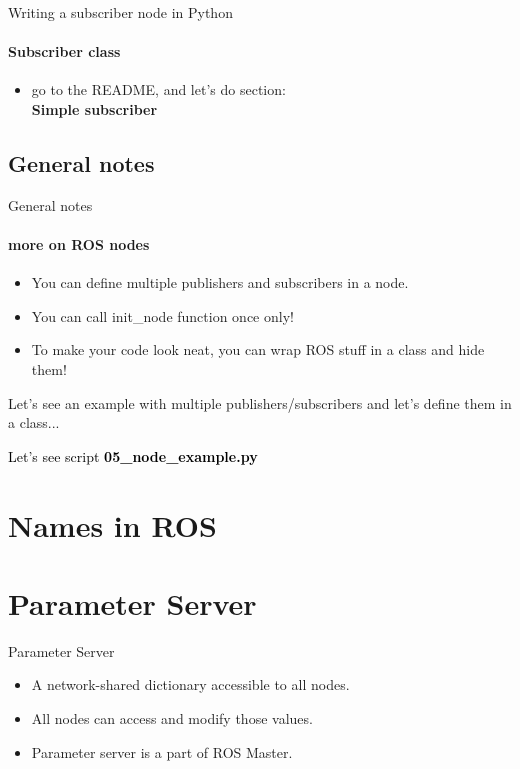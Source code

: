 \documentclass{beamer}
\begin{document}
\begin{frame}[fragile]{Writing a subscriber node in Python}
    \framesubtitle{Subscriber class}
    
    
    \begin{itemize}
        \centering
        \item go to the README, and let's do section:\\ 
        \textbf{Simple subscriber}
    \end{itemize} 
\end{frame}


\subsection{General notes}
\begin{frame}{General notes}
    \framesubtitle{more on ROS nodes}
    \begin{itemize}
        \item You can define multiple publishers and subscribers in a node.
        \item You can call {\ttfamily \colorbox{gray!30!white}{init\_node}} function once only!
        \item To make your code look neat, you can wrap ROS stuff in a class and hide them!
    \end{itemize} 
    \vspace{0.5cm}
    Let's see an example with multiple publishers/subscribers and let's define them in a class...
\end{frame}


\begin{frame}[plain]{}  
    \centering
    {\huge \textcolor{black}{Let's see script \textbf{05\_node\_example.py}}}
\end{frame}

\section{Names in ROS}

\section{Parameter Server}

\begin{frame}{Parameter Server}
    \begin{itemize}
        \item A network-shared dictionary accessible to all nodes.
        \item  All nodes can access and modify those values.
        \item Parameter server is a part of ROS Master.
    \end{itemize}  
\end{frame}
\end{document}
